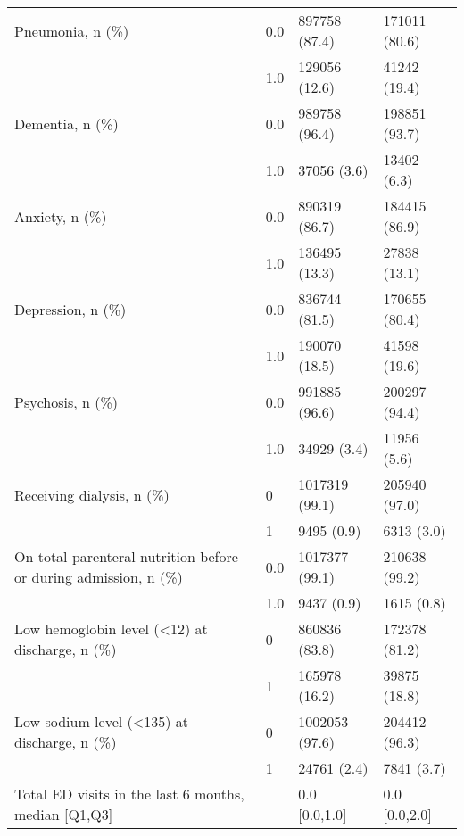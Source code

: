\begin{tabular}{llll}
Pneumonia, n (\%) & 0.0 &                         897758 (87.4) &      171011 (80.6) \\
                                       & 1.0 &                         129056 (12.6) &       41242 (19.4) \\
Dementia, n (\%) & 0.0 &                         989758 (96.4) &      198851 (93.7) \\
                                       & 1.0 &                           37056 (3.6) &        13402 (6.3) \\
Anxiety, n (\%) & 0.0 &                         890319 (86.7) &      184415 (86.9) \\
                                       & 1.0 &                         136495 (13.3) &       27838 (13.1) \\
Depression, n (\%) & 0.0 &                         836744 (81.5) &      170655 (80.4) \\
                                       & 1.0 &                         190070 (18.5) &       41598 (19.6) \\
Psychosis, n (\%) & 0.0 &                         991885 (96.6) &      200297 (94.4) \\
                                       & 1.0 &                           34929 (3.4) &        11956 (5.6) \\
Receiving dialysis, n (\%) & 0 &                        1017319 (99.1) &      205940 (97.0) \\
                                       & 1 &                            9495 (0.9) &         6313 (3.0) \\
On total parenteral nutrition before or during admission, n (\%) & 0.0 &                        1017377 (99.1) &      210638 (99.2) \\
                                       & 1.0 &                            9437 (0.9) &         1615 (0.8) \\
Low hemoglobin level (<12) at discharge, n (\%) & 0 &                         860836 (83.8) &      172378 (81.2) \\
                                       & 1 &                         165978 (16.2) &       39875 (18.8) \\
Low sodium level (<135) at discharge, n (\%) & 0 &                        1002053 (97.6) &      204412 (96.3) \\
                                       & 1 &                           24761 (2.4) &         7841 (3.7) \\
Total ED visits in the last 6 months, median [Q1,Q3] &   &                         0.0 [0.0,1.0] &      0.0 [0.0,2.0] \\

\end{tabular}
